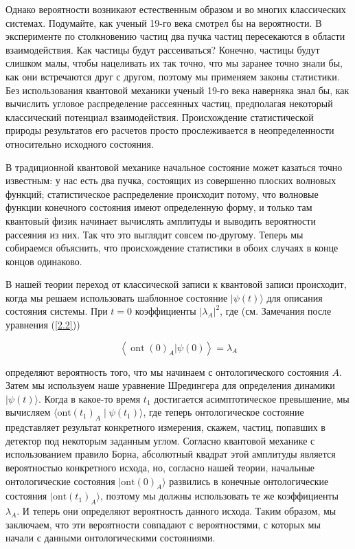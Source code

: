 \documentclass[main.tex]{subfiles}
\begin{document}
Однако вероятности возникают естественным образом и во многих классических системах. Подумайте, как ученый 19-го века смотрел бы на вероятности. В эксперименте по столкновению частиц два пучка частиц пересекаются в области взаимодействия. Как частицы будут рассеиваться? Конечно, частицы будут слишком малы, чтобы нацеливать их так точно, что мы заранее точно знали бы, как они встречаются друг с другом, поэтому мы применяем законы статистики. Без использования квантовой механики ученый 19-го века наверняка знал бы, как вычислить угловое распределение рассеянных частиц, предполагая некоторый классический потенциал взаимодействия. Происхождение статистической природы результатов его расчетов просто прослеживается в неопределенности относительно исходного состояния.

В традиционной квантовой механике начальное состояние может казаться точно известным: у нас есть два пучка, состоящих из совершенно плоских волновых функций; статистическое распределение происходит потому, что волновые функции конечного состояния имеют определенную форму, и только там квантовый физик начинает вычислять амплитуды и выводить вероятности рассеяния из них. Так что это выглядит совсем по-другому. Теперь мы собираемся объяснить, что происхождение статистики в обоих случаях в конце концов одинаково.

В нашей теории переход от классической записи к квантовой записи происходит, когда мы решаем использовать шаблонное состояние $|\psi(t)\rangle$ для описания состояния системы. При $t = 0$ коэффициенты $|\lambda_A|^2$, где (см. Замечания после уравнения (\ref{2.2}))

\begin{equation}\label{4.3}
	\left\langle\operatorname{ont}(0)_{A} | \psi(0)\right\rangle=\lambda_{A}
\end{equation}

определяют вероятность того, что мы начинаем с онтологического состояния $A$. Затем мы используем наше уравнение Шредингера для определения динамики $|\psi(t)\rangle$. Когда в какое-то время $t_1$ достигается асимптотическое превышение, мы вычисляем $\langle \mathrm{ont}(t_1)_A \mid \psi(t_1) \rangle$, где теперь онтологическое состояние представляет результат конкретного измерения, скажем, частиц, попавших в детектор под некоторым заданным углом. Согласно квантовой механике с использованием правило Борна, абсолютный квадрат этой амплитуды является вероятностью конкретного исхода, но, согласно нашей теории, начальные онтологические состояния $|\mathrm{ont}(0)_A\rangle$ развились в конечные онтологические состояния $|\mathrm{ont}(t_1)_A\rangle$, поэтому мы должны использовать те же коэффициенты $\lambda_A$. И теперь они определяют вероятность данного исхода. Таким образом, мы заключаем, что эти вероятности совпадают с вероятностями, с которых мы начали с данными онтологическими состояниями.
\end{document}
